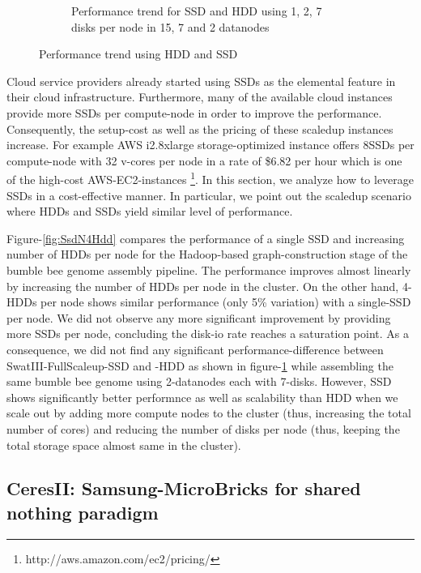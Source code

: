 \documentclass[conference]{IEEEtran}
\begin{document}
\begin{figure}[h]
\begin{subfigure}[b]{0.23\textwidth}
          \caption{Performance trend for SSD and HDD using 1, 2, 7 disks per node in 15, 7 and 2 datanodes}
          \label{fig:SsdNHddDiffNodes}
  \end{subfigure}
  \caption{Performance trend using HDD and SSD}
  \label{fig:SsdNHdd}
\end{figure}
Cloud service providers already started using SSDs as the elemental feature in their cloud infrastructure.
Furthermore, many of the available cloud instances provide more SSDs per compute-node in order to improve the performance.
Consequently, the setup-cost as well as the pricing of these scaledup instances increase.
For example AWS i2.8xlarge storage-optimized instance offers 8SSDs per compute-node with 32 v-cores per node in a rate of \$6.82 per hour which is one of the high-cost AWS-EC2-instances \footnote{http://aws.amazon.com/ec2/pricing/}.
In this section, we analyze how to leverage SSDs in a cost-effective manner.
In particular, we point out the scaledup scenario where HDDs and SSDs yield similar level of performance.

Figure-\ref{fig:SsdN4Hdd} compares the performance of a single SSD and  increasing number of HDDs per node for the Hadoop-based graph-construction stage of the bumble bee genome assembly pipeline.
The performance improves almost linearly by increasing the number of HDDs per node in the cluster.
On the other hand, 4-HDDs per node shows similar performance (only 5\% variation) with a single-SSD per node.
We did not observe any more significant improvement by providing more SSDs per node, concluding the disk-io rate reaches a saturation point.
As a consequence, we did not find any significant performance-difference between SwatIII-FullScaleup-SSD and -HDD as shown in figure-\ref{fig:SsdNHddDiffNodes} while assembling the same bumble bee genome using 2-datanodes each with 7-disks.
However, SSD shows significantly better performnce as well as scalability than HDD when we scale out by adding more compute nodes to the cluster (thus, increasing the total number of cores) and reducing the number of disks per node (thus, keeping the total storage space almost same in the cluster).

\subsection {CeresII: Samsung-MicroBricks for shared nothing paradigm} \label{CeresII:Scaledout-in-a-boxAndSSD}
\end{document}
